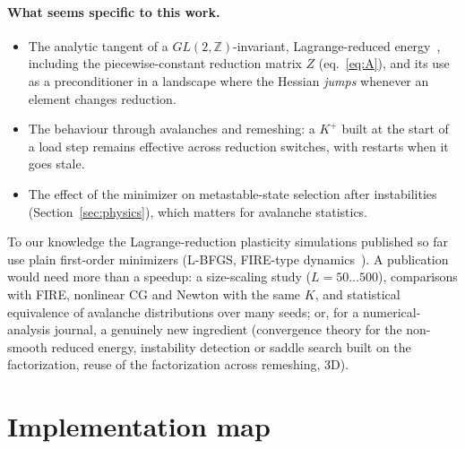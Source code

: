 \documentclass[11pt,a4paper]{article}
\theoremstyle{remark}
\begin{document}
\paragraph{What seems specific to this work.}
\begin{itemize}[leftmargin=*]
\item The analytic tangent of a $GL(2,\mathbb Z)$-invariant, Lagrange-reduced
energy~\cite{conti2004,baggio2019}, including the piecewise-constant reduction matrix $Z$
(eq.~\eqref{eq:A}), and its use as a preconditioner in a landscape where the Hessian
\emph{jumps} whenever an element changes reduction.
\item The behaviour through avalanches and remeshing: a $K^+$ built at the start of a load step
remains effective across reduction switches, with restarts when it goes stale.
\item The effect of the minimizer on metastable-state selection after instabilities
(Section~\ref{sec:physics}), which matters for avalanche statistics.
\end{itemize}
To our knowledge the Lagrange-reduction plasticity simulations published so far use plain
first-order minimizers (L-BFGS, FIRE-type dynamics~\cite{bitzek2006}). A publication would need
more than a speedup: a size-scaling study ($L=50\ldots500$), comparisons with FIRE, nonlinear CG
and Newton with the same $K$, and statistical equivalence of avalanche distributions over many
seeds; or, for a numerical-analysis journal, a genuinely new ingredient (convergence theory for the
non-smooth reduced energy, instability detection or saddle search built on the factorization,
reuse of the factorization across remeshing, 3D).

\section{Implementation map}
\end{document}

